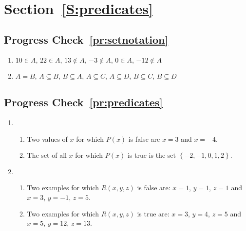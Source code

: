 \section*{Section~\ref{S:predicates}}

\subsection*{Progress Check~\ref{pr:setnotation}}
\begin{enumerate}
  \item $10 \in A$, $22 \in A$, $13 \notin A$, $-3 \notin A$, $0 \in A$, $-12 \notin A$
  \item $A = B$, $A \subseteq B$, $B \subseteq A$, $A \subseteq C$, $A \subseteq D$, $B \subseteq C$, $B \subseteq D$
\end{enumerate}


\subsection*{Progress Check~\ref{pr:predicates}}
\begin{enumerate}
\item \begin{enumerate}
\item Two values of  $x$  for which  $P( x )$  is false are  $x = 3$ and $x = -4$.
\setcounter{enumii}{2}

\item The set of all $x$  for which  $P( x )$ is true is the set  
$\left\{ -2, -1, 0, 1, 2 \right\}$.
\end{enumerate}

\item \begin{enumerate}
\item Two examples for which  $R( {x, y, z} )$ is false are:  $x = 1$, $y = 1$, 
$z = 1$  and  $x = 3$, $y =  - 1$, $z = 5$.
\item Two examples for which  $R( {x, y, z} )$ is true are: $x = 3$, $y = 4$, 
$z = 5$  and  $x = 5$, $y = 12$, $z = 13$.
\end{enumerate}
\end{enumerate}



